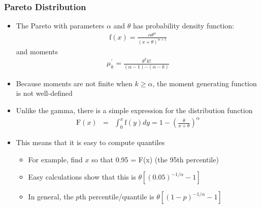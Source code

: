 \documentclass{beamer}
\begin{document}
\begin{frame}%
\frametitle{Pareto Distribution}
\begin{itemize}
\item The Pareto with parameters $\alpha$ and $\theta$ has probability density function:
\begin{eqnarray*}
\mathrm{f}(x) = \frac{\alpha \theta^{\alpha}}{(x+\theta)^{\alpha+1}}
\end{eqnarray*} %
and moments
\begin{eqnarray*}
\mu_k^{\prime}= \frac{\theta^k k!}{(\alpha-1) \cdots (\alpha-k)}
\end{eqnarray*} %
\item Because moments are not finite when $k \ge \alpha$, the moment generating function is not well-defined %
\item Unlike the gamma, there is a simple expression for the distribution function
\begin{eqnarray*}
\mathrm{F}(x) &=& \int^x_0 \mathrm{f}(y) dy = 1 -
\left(\frac{\theta}{x+\theta}\right)^{\alpha}
\end{eqnarray*} %
\item This means that it is easy to compute quantiles
\begin{itemize}
\item For example, find $x$ so that 0.95 = F(x) (the 95th percentile) %
\item Easy calculations show that this is $\theta \left[(0.05)^{-1/\alpha} - 1\right]$ %
\item In general, the $p$th percentile/quantile is $\theta \left[(1-p)^{-1/\alpha} - 1\right]$
\end{itemize}\end{itemize}
\end{frame}
\end{document}
